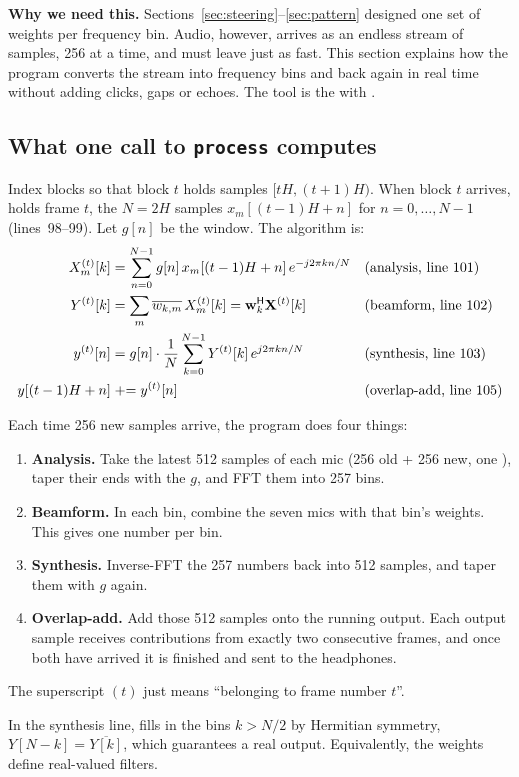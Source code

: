 \documentclass[11pt]{article}
\begin{document}
\noindent\textbf{Why we need this.} Sections~\ref{sec:steering}--\ref{sec:pattern} designed one
set of weights per frequency bin. Audio, however, arrives as an endless stream of samples, 256 at
a time, and must leave just as fast. This section explains how the program converts the stream
into frequency bins and back again in real time without adding clicks, gaps or echoes. The tool
is the  with .


\subsection{What one call to \texttt{process} computes}

Index blocks so that block $t$ holds samples $[tH,(t+1)H)$. When block $t$ arrives,
 holds frame $t$, the $N=2H$ samples $x_m[(t-1)H+n]$ for $n=0,\dots,N-1$
(lines~98--99). Let $g[n]$ be the window. The algorithm is:
\begin{align}
  X_m^{(t)}[k]&=\sum_{n=0}^{N-1}g[n]\,x_m[(t-1)H+n]\,e^{-j2\pi kn/N}
     &&\text{(analysis, line 101)}\\
  Y^{(t)}[k]&=\sum_{m}\overline{w_{k,m}}\,X_m^{(t)}[k]=\mathbf{w}_k^{\mathsf H}\mathbf{X}^{(t)}[k]
     &&\text{(beamform, line 102)}\\
  y^{(t)}[n]&=g[n]\cdot\frac1N\sum_{k=0}^{N-1}Y^{(t)}[k]\,e^{j2\pi kn/N}
     &&\text{(synthesis, line 103)}\\
  y[(t-1)H+n]&\mathrel{+}=y^{(t)}[n]
     &&\text{(overlap-add, line 105)}
\end{align}

\begin{inplainwords}
Each time 256 new samples arrive, the program does four things:
\begin{enumerate}[nosep]
\item \textbf{Analysis.} Take the latest 512 samples of each mic (256 old + 256 new, one
  ), taper their ends with the  $g$, and FFT them into
  257 bins.
\item \textbf{Beamform.} In each bin, combine the seven mics with that bin's weights. This gives
  one number per bin.
\item \textbf{Synthesis.} Inverse-FFT the 257 numbers back into 512 samples, and taper them with
  $g$ again.
\item \textbf{Overlap-add.} Add those 512 samples onto the running output. Each output sample
  receives contributions from exactly two consecutive frames, and once both have arrived it is
  finished and sent to the headphones.
\end{enumerate}
The superscript $(t)$ just means ``belonging to frame number $t$''.
\end{inplainwords}
In the synthesis line,  fills in the bins $k>N/2$ by Hermitian symmetry,
$Y[N-k]=\overline{Y[k]}$, which guarantees a real output. Equivalently, the weights define
real-valued filters.
\end{document}
